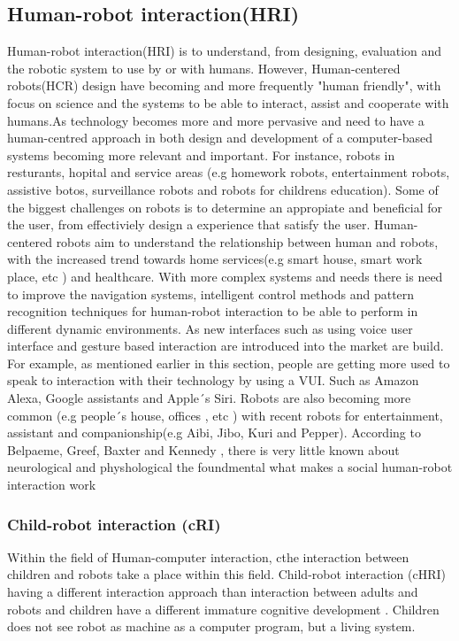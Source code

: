\subsection{Human-robot interaction(HRI)}
Human-robot interaction(HRI) is to understand, from designing, evaluation and the robotic system to use by or with humans\cite{etellerannet}. However, Human-centered robots(HCR) design have becoming and more frequently "human friendly", with focus on science and the systems to be able to interact, assist and cooperate with humans.As technology becomes more and more pervasive and need to have a human-centred approach in both design and development of a computer-based systems becoming more relevant and important. For instance, robots in resturants, hopital and service areas (e.g homework robots, entertainment robots, assistive botos, surveillance robots and robots for childrens  education). Some of the biggest challenges on robots is to determine an appropiate and beneficial for the user, from effectiviely design a experience that satisfy the user\cite{Willies}. Human-centered robots aim to understand the relationship between human and robots, with the increased trend towards home services(e.g smart house, smart work place, etc ) and healthcare. With more complex  systems and needs there is need to improve the navigation systems, intelligent control methods and pattern recognition techniques for human-robot interaction to be able to perform in different dynamic environments\cite{He-Li-Chen}.
As new interfaces such as using voice user interface and gesture based interaction are introduced into the market are build. For example, as mentioned earlier in this section, people are getting more used to speak to interaction with their technology by using a VUI. Such as  Amazon Alexa, Google assistants and Apple´s Siri. Robots are also becoming more common (e.g people´s house, offices , etc ) with recent robots for entertainment, assistant and companionship(e.g Aibi, Jibo, Kuri and Pepper). According to Belpaeme, Greef, Baxter and Kennedy \cite{Baxter}, there is very little known about neurological and physhological the foundmental what makes a social human-robot interaction work

\subsubsection{Child-robot interaction (cRI)}
Within the field of Human-computer interaction, cthe interaction between children and robots take a place within this field. Child-robot interaction (cHRI) having a different interaction approach than interaction between adults and robots and children have a different immature  cognitive development \cite{Baxter}. Children does not see robot as machine as a  computer program, but a living system. 

